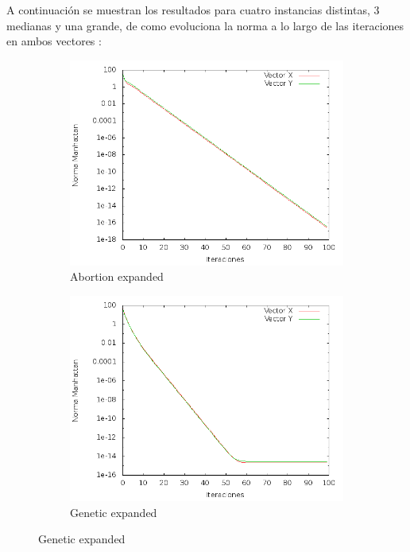 A continuación se muestran los resultados para cuatro instancias distintas, 3 medianas y una grande, de como evoluciona la norma a lo largo de las iteraciones en ambos vectores :

\begin{figure}[!htb]
\begin{subfigure}{.5\textwidth}
       \includegraphics[scale=0.4]{imagenes/hits-abortion-expanded.png}
       \caption{Abortion expanded }
\end{subfigure}
\begin{subfigure}{.5\textwidth}
        \includegraphics[scale=0.4]{imagenes/hits-genetic-expanded.png}
       \caption{Genetic expanded }
\end{subfigure}


\end{figure}
